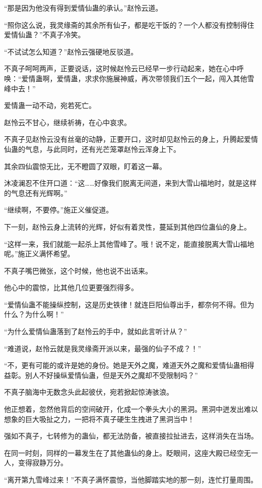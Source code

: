 \begin{this_body}
“那是因为他没有得到爱情仙蛊的承认。”赵怜云道。

“照你这么说，我灵缘斋的其余所有仙子，都是吃干饭的？一个人都没有控制得住爱情仙蛊？”不真子冷笑。

“不试试怎么知道？”赵怜云强硬地反驳道。

不真子呵呵两声，正要说话，这时候赵怜云已经早一步行动起来，她在心中呼唤：“爱情蛊啊，爱情蛊，求求你施展神威，再次带领我们五个一起，闯入其他雪峰中去！”

爱情蛊一动不动，宛若死亡。

赵怜云不甘心，继续祈祷，在心中哀求。

不真子见赵怜云没有丝毫的动静，正要开口，这时却见赵怜云的身上，升腾起爱情仙蛊的气息，与此同时，还有光芒笼罩赵怜云浑身上下。

其余四仙震惊无比，无不瞪圆了双眼，盯着这一幕。

沐凌澜忍不住开口道：“这……好像我们脱离无间道，来到大雪山福地时，就是这样的气息还有光辉啊。”

“继续啊，不要停。”施正义催促道。

下一刻，赵怜云身上流转的光辉，好似有着灵性，蔓延到其他四位蛊仙的身上。

“这样一来，我们就能一起杀上其他雪峰了。哦！说不定，能直接脱离大雪山福地呢。”施正义满怀希望。

不真子嘴巴微张，这个时候，他也说不出话来。

他心中的震惊，比其他几位更要强烈得多。

“爱情仙蛊不能操纵控制，这是历史铁律！就连巨阳仙尊出手，都奈何不得。但为什么？为什么啊！”

“为什么爱情仙蛊落到了赵怜云的手中，就如此言听计从？”

“难道说，赵怜云就是我灵缘斋开派以来，最强的仙子不成？！”

“不，更有可能的或许是她的身份。她是天外之魔，难道天外之魔和爱情仙蛊相得益彰。别人不好操纵爱情仙蛊，但是天外之魔却不受限制吗？”

不真子脑海中无数念头此起彼伏，宛若掀起惊涛骇浪。

他正想着，忽然他背后的空间破开，化成一个拳头大小的黑洞。黑洞中迸发出难以想象的巨大吸扯之力，一把将不真子硬生生拽进了黑洞当中！

强如不真子，七转修为的蛊仙，都无法防备，被直接拉扯进去，这样消失在当场。

在同一时刻，同样的一幕发生在了其他蛊仙的身上。眨眼间，这座大殿已经空无一人，变得寂静万分。

“离开第九雪峰过来！”不真子满怀震惊，当他脚踏实地的那一刻，连忙打量周围。


\end{this_body}
